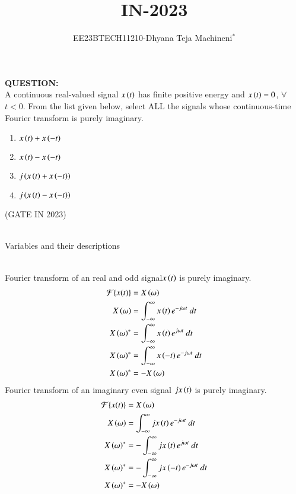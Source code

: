 \documentclass[journal,12pt,twocolumn]{IEEEtran}
\theoremstyle{remark}
\begin{document}

\vspace{3cm}
\title{\textbf{IN-2023}}
\author{EE23BTECH11210-Dhyana Teja Machineni$^{*}$%
}
\maketitle
\newpage
\bigskip

\textbf{QUESTION:}\\
A continuous real-valued signal $x\left(t\right)$ has finite positive energy and $x\left(t\right) = 0$, $\forall$ $t < 0$. From the list given below, select ALL the signals whose
continuous-time Fourier transform is purely imaginary.\\
\begin{enumerate}
\item$x\left(t\right) + x\left(-t\right)$
\item$x\left(t\right) - x\left(-t\right)$
\item$j\left(x\left(t\right) + x\left(-t\right)\right)$
\item$j\left(x\left(t\right) - x\left(-t\right)\right)$
\end{enumerate}
\hfill{(GATE IN 2023)}\\
\solution\\
\begin{table}[h]
         \label{tab:table}
         
         \caption{Variables and their descriptions}
     \end{table}\\
Fourier transform of an real and odd signal$x\left(t\right)$ is purely imaginary.\\
\begin{align}
\mathcal{F}\{x(t)\} &= X\brak{\omega}\\
X\brak{\omega}&=\int_{-\infty}^{\infty} x\brak{t} e^{-j \omega t} \ dt\\
X\brak{\omega}^*&=\int_{-\infty}^{\infty} x\brak{t} e^{j \omega t} \ dt\\
X\brak{\omega}^*&=\int_{-\infty}^{\infty} x\brak{-t} e^{-j \omega t} \ dt\\
X\brak{\omega}^*&=-X\brak{\omega}
\end{align}
 Fourier transform of an imaginary even signal $jx\left(t\right)$ is purely imaginary.\\
\begin{align}
\mathcal{F}\{x(t)\} &= X\brak{\omega}\\
X\brak{\omega}&=\int_{-\infty}^{\infty} jx\brak{t} e^{-j \omega t} \ dt\\
X\brak{\omega}^*&=-\int_{-\infty}^{\infty} jx\brak{t} e^{j \omega t} \ dt\\
X\brak{\omega}^*&=-\int_{-\infty}^{\infty} jx\brak{-t} e^{-j \omega t} \ dt\\
X\brak{\omega}^*&=-X\brak{\omega}
\end{align}
\end{document}
